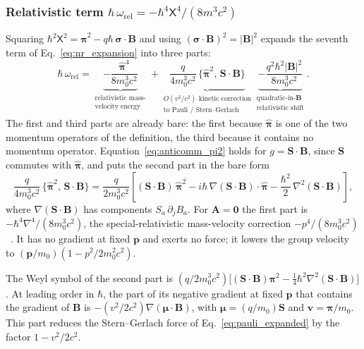 \documentclass[aps,prd,onecolumn,tightenlines,nofootinbib,notitlepage,11pt,floatfix]{revtex4-2}
\theoremstyle{indentedtheorem}
\begin{document}
\subsubsection{Relativistic term \texorpdfstring{$\hbar\,\omega_\text{rel}=-\hbar^4\mathsf{X}^4/(8m^3c^2)$}{hbar omega rel}}
\label{sec:term_rel}

Squaring $\hbar^2\mathsf{X}^2 = \hat{\boldsymbol{\pi}}^2 - q\hbar\,\boldsymbol{\sigma}\cdot\mathbf{B}$ and using $(\boldsymbol{\sigma}\cdot\mathbf{B})^2=|\mathbf{B}|^2$ expands the seventh term of Eq.~\eqref{eq:nr_expansion} into three parts:
\begin{equation}
    \hbar\,\omega_\text{rel} =
    \underbrace{- \frac{\hat{\boldsymbol{\pi}}^4}{8m_0^3c^2}}_{\substack{\text{relativistic mass-} \\ \text{velocity energy}}}
    + \underbrace{\frac{q}{4m_0^3c^2}\,\big\{\hat{\boldsymbol{\pi}}^2,\,\mathbf{S}\cdot\mathbf{B}\big\}}_{\substack{\text{$O(v^2/c^2)$ kinetic correction} \\ \text{to Pauli / Stern--Gerlach}}}
    \underbrace{- \frac{q^2\hbar^2|\mathbf{B}|^2}{8m_0^3c^2}}_{\substack{\text{quadratic-in-$\mathbf{B}$} \\ \text{relativistic shift}}} .
    \label{eq:rel_expanded}
\end{equation}
The first and third parts are already bare: the first because $\hat{\boldsymbol{\pi}}$ is one of the two momentum operators of the definition, the third because it contains no momentum operator. Equation~\eqref{eq:anticomm_pi2} holds for $g=\mathbf{S}\cdot\mathbf{B}$, since $\mathbf{S}$ commutes with $\hat{\boldsymbol{\pi}}$, and puts the second part in the bare form
\begin{equation}
    \frac{q}{4m_0^3c^2}\,\big\{\hat{\boldsymbol{\pi}}^2,\,\mathbf{S}\cdot\mathbf{B}\big\} = \frac{q}{2m_0^3c^2}\left[(\mathbf{S}\cdot\mathbf{B})\,\hat{\boldsymbol{\pi}}^2 - i\hbar\,\nabla(\mathbf{S}\cdot\mathbf{B})\cdot\hat{\boldsymbol{\pi}} - \frac{\hbar^2}{2}\,\nabla^2(\mathbf{S}\cdot\mathbf{B})\right] ,
    \label{eq:rel_pauli_bare}
\end{equation}
where $\nabla(\mathbf{S}\cdot\mathbf{B})$ has components $S_a\,\partial_jB_a$. For $\mathbf{A}=\mathbf{0}$ the first part is $-\hbar^4\nabla^4/(8m_0^3c^2)$, the special-relativistic mass-velocity correction $-p^4/(8m_0^3c^2)$~\citep{Darwin1928Wave,Foldy1950Dirac}. It has no gradient at fixed $\mathbf{p}$ and exerts no force; it lowers the group velocity to $(\mathbf{p}/m_0)(1-p^2/2m_0^2c^2)$.

The Weyl symbol of the second part is $(q/2m_0^3c^2)\big[(\mathbf{S}\cdot\mathbf{B})\boldsymbol{\pi}^2-\tfrac{1}{4}\hbar^2\nabla^2(\mathbf{S}\cdot\mathbf{B})\big]$. At leading order in $\hbar$, the part of its negative gradient at fixed $\mathbf{p}$ that contains the gradient of $\mathbf{B}$ is $-(v^2/2c^2)\nabla(\boldsymbol{\mu}\cdot\mathbf{B})$, with $\boldsymbol{\mu}=(q/m_0)\mathbf{S}$ and $\mathbf{v}=\boldsymbol{\pi}/m_0$. This part reduces the Stern--Gerlach force of Eq.~\eqref{eq:pauli_expanded} by the factor $1-v^2/2c^2$.
\end{document}
